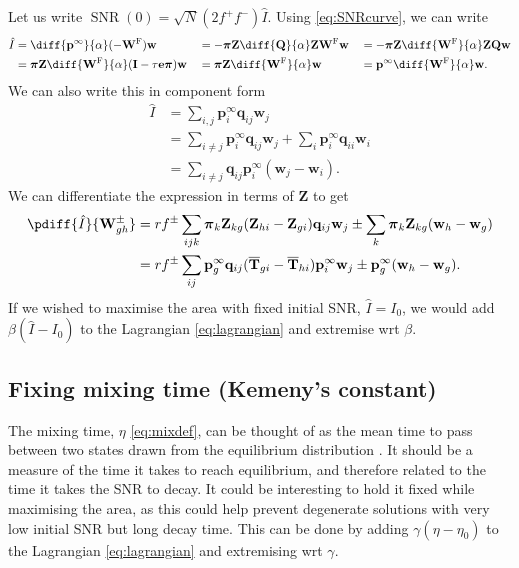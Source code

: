 \documentclass[12pt]{article}
\newcommand{\I}{\mathbf{I}}
\newcommand{\onev}{\mathbf{e}}
\newcommand{\MM}{\mathbf{Q}}
\newcommand{\eq}{\mathbf{p}^\infty}
\newcommand{\fpt}{\mathbf{T}}
\newcommand{\fptb}{\overline{\fpt}}
\newcommand{\fund}{\mathbf{Z}}
\newcommand{\pib}{\boldsymbol{\pi}}
\newcommand{\w}{\mathbf{w}}
\newcommand{\W}{\mathbf{W}}
\newcommand{\enc}{\mathbf{q}}
\newcommand{\frg}{\W^{\mathrm{F}}}
\DeclareMathOperator{\SNR}{SNR}
\begin{document}
Let us write $\SNR(0) = \sqrt{N} (2f^+f^-) \hat{I}$. Using \eqref{eq:SNRcurve}, we can write
%
\begin{equation}\label{eq:initSNR}
  \begin{aligned}
    \hat{I} &= \diff{\eq}{\alpha}(-\frg)\w &
      &= - \pib \fund \diff{\MM}{\alpha} \fund \frg \w &
      &= - \pib \fund \diff{\frg}{\alpha} \fund \MM \w \\
      &= \pib \fund \diff{\frg}{\alpha} (\I - \tau\onev\pib) \w &
      &= \pib \fund \diff{\frg}{\alpha} \w &
      &= \eq \diff{\frg}{\alpha} \w .
  \end{aligned}
\end{equation}
%
We can also write this in component form
%
\begin{equation}\label{eq:initSNRcmpt}
  \begin{aligned}
     \hat{I} &= \sum_{i,j} \eq_i \enc_{ij} \w_j \\
      &= \sum_{i \neq j} \eq_i \enc_{ij} \w_j + \sum_i \eq_i \enc_{ii} \w_i \\
      &= \sum_{i \neq j} \enc_{ij} \eq_i (\w_j - \w_i).
  \end{aligned}
\end{equation}
%
We can differentiate the expression in terms of $\fund$ to get
%
\begin{equation}\label{eq:initSNRdiff}
 \begin{aligned}
  \pdiff{\hat{I}}{\W^\pm_{gh}}
    &= rf^\pm \sum_{ijk} \pib_k \fund_{kg} (\fund_{hi}-\fund_{gi}) \enc_{ij} \w_j
    \pm \sum_k \pib_k \fund_{kg} (\w_h - \w_g) \\
    &= rf^\pm \sum_{ij} \eq_g \enc_{ij} (\fptb_{gi}-\fptb_{hi}) \eq_i \w_j
    \pm \eq_g (\w_h - \w_g).
 \end{aligned}
\end{equation}
%
If we wished to maximise the area with fixed initial SNR, $\hat{I}=I_0$, we would add $\beta(\hat{I}-I_0)$ to the Lagrangian \eqref{eq:lagrangian} and extremise wrt $\beta$.

\subsection{Fixing mixing time (Kemeny's  constant)}\label{sec:fixmix}

The mixing time, $\eta$ \eqref{eq:mixdef}, can be thought of as the mean time to pass between two states drawn from the equilibrium distribution \cite{hunter2006mixing,levene2002kemeny}. It should be a measure of the time it takes to reach equilibrium, and therefore related to the time it takes the SNR to decay. It could be interesting to hold it fixed while maximising the area, as this could help prevent degenerate solutions with very low initial SNR but long decay time. This can be done by adding $\gamma(\eta-\eta_0)$ to the Lagrangian \eqref{eq:lagrangian} and extremising wrt $\gamma$.
\end{document}

